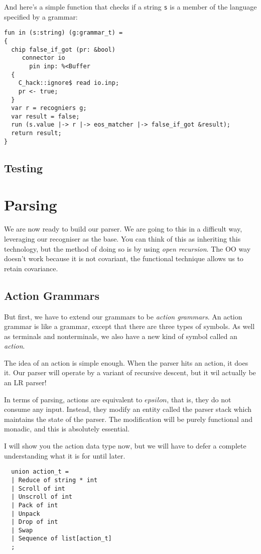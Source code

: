 \documentclass[oneside]{book}
\begin{document}
And here's a simple function that checks if a string \verb$s$
is a member of the language specified by a grammar:

\begin{verbatim}
fun in (s:string) (g:grammar_t) =
{
  chip false_if_got (pr: &bool)
     connector io
       pin inp: %<Buffer
  {
    C_hack::ignore$ read io.inp;
    pr <- true;
  }
  var r = recogniers g;
  var result = false;
  run (s.value |-> r |-> eos_matcher |-> false_if_got &result);
  return result;
}
\end{verbatim}

\section{Testing}

\chapter{Parsing}
We are now ready to build our parser.
We are going to this in a difficult way, leveraging
our recogniser as the base. You can think of this
as inheriting this technology, but the method of doing
so is by using {\em open recursion}. The OO way doesn't
work because it is not covariant, the functional technique
allows us to retain covariance.

\section{Action Grammars}
But first, we have to extend our grammars to be {\em action
grammars}. An action grammar is like a grammar, except that
there are three types of symbols. As well as terminals and
nonterminals, we also have a new kind of symbol called
an {\em action}.

The idea of an action is simple enough. When the parser hits
an action, it does it. Our parser will operate by a variant
of recursive descent, but it wil actually be an LR parser!

In terms of parsing, actions are equivalent to $epsilon$,
that is, they do not consume any input. Instead, they modify
an entity called the parser stack which maintains the state
of the parser. The modification will be purely functional
and monadic, and this is absolutely essential.

I will show you the action data type now, but we will have
to defer a complete understanding what it is for until later.

\begin{verbatim}
  union action_t =  
  | Reduce of string * int
  | Scroll of int
  | Unscroll of int
  | Pack of int
  | Unpack
  | Drop of int
  | Swap
  | Sequence of list[action_t]
  ;
\end{verbatim}
\end{document}
